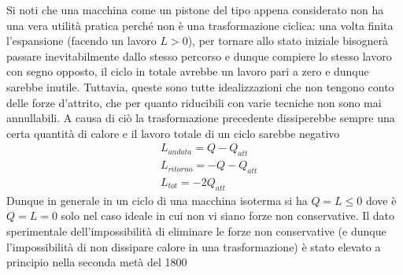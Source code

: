 \documentclass[10pt,a4paper]{article}
\begin{document}
Si noti che una macchina come un pistone del tipo appena considerato non ha una vera utilità pratica perché non è una trasformazione ciclica: una volta finita l'espansione (facendo un lavoro $L>0$), per tornare allo stato iniziale bisognerà passare inevitabilmente dallo stesso percorso e dunque compiere lo stesso lavoro con segno opposto, il ciclo in totale avrebbe un lavoro pari a zero e dunque sarebbe inutile. Tuttavia, queste sono tutte idealizzazioni che non tengono conto delle forze d'attrito, che per quanto riducibili con varie tecniche non sono mai annullabili. A causa di ciò la trasformazione precedente dissiperebbe sempre una certa quantità di calore e il lavoro totale di un ciclo sarebbe negativo
\begin{align*}
	&L_{andata} = Q-Q_{att}\\
	&L_{ritorno} = -Q-Q_{att}\\
	&L_{tot} = -2Q_{att}
\end{align*}
Dunque in generale in un ciclo di una macchina isoterma si ha \(Q = L \leq 0\) dove è \(Q=L=0\) solo nel caso ideale in cui non vi siano forze non conservative. Il dato sperimentale dell'impossibilità di eliminare le forze non conservative (e dunque l'impossibilità di non dissipare calore in una trasformazione) è stato elevato a principio nella seconda metà del 1800
\end{document}
